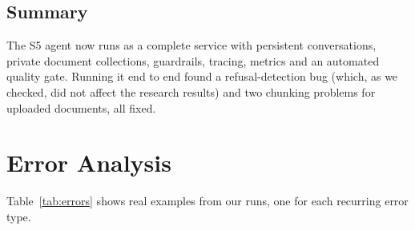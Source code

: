 \documentclass[11pt,a4paper]{report}
\begin{document}
\section{Summary}
The S5 agent now runs as a complete service with persistent conversations, private document collections, guardrails, tracing, metrics and an automated quality gate. Running it end to end found a refusal-detection bug (which, as we checked, did not affect the research results) and two chunking problems for uploaded documents, all fixed.



\chapter{Error Analysis}\label{ch:errors}
Table~\ref{tab:errors} shows real examples from our runs, one for each recurring error type.
\end{document}
